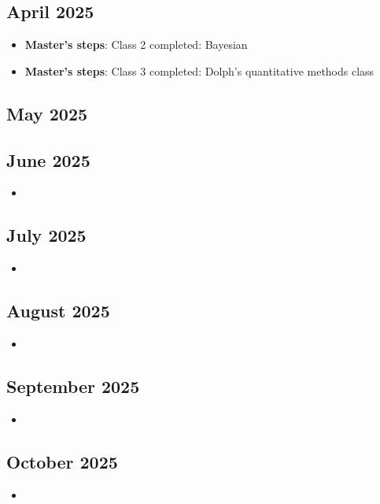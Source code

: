 \documentclass{article}
\begin{document}
\subsection {April 2025}
\begin {itemize}
	\item \textbf{Master's steps}: Class 2 completed: Bayesian
	\item \textbf{Master's steps}: Class 3 completed: Dolph's quantitative methods class
\end {itemize}

\subsection {May 2025}
\begin {itemize}

\end {itemize}

\subsection {June 2025}
\begin {itemize}
	\item \textbf{}
\end {itemize}

\subsection {July 2025}
\begin {itemize}
	\item \textbf{}
\end {itemize}

\subsection {August 2025}
\begin {itemize}
	\item \textbf{}
\end {itemize}

\subsection {September 2025}
\begin {itemize}
	\item \textbf{}
\end {itemize}

\subsection {October 2025}
\begin {itemize}
	\item \textbf{}
\end {itemize}
\end{document}
